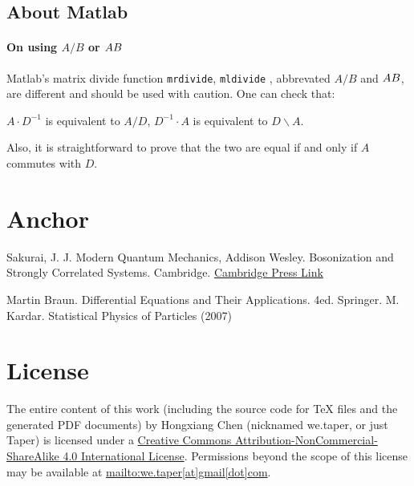 \documentclass{article}
\numberwithin{equation}{subsection} %
\theoremstyle{definition}
\begin{document}
    \subsection{About Matlab}
    \label{sec:About-Matlab}
    \paragraph{On using $A/B$ or $A\\B$}
    Matlab's matrix divide function \texttt{mrdivide}, \texttt{mldivide}
    , abbrevated $A/B$ and $A\\B$, are different and should be used with
    caution. One can check that:
    \begin{center}
        $A\cdot D^{-1}$ is equivalent to $A/D$, $D^{-1}\cdot A$ is
        equivalent to $D\backslash A$.
    \end{center}
    Also, it is straightforward to prove that the two are equal if and only if $A$ commutes with $D$.
\section{Anchor}
\begin{thebibliography}{1}
	 Sakurai, J. J. Modern Quantum Mechanics, Addison Wesley.
        Bosonization and Strongly Correlated Systems. Cambridge.
        \href{http://www.cambridge.org/us/academic/subjects/physics/condensed-matter-physics-nanoscience-and-mesoscopic-physics/bosonization-and-strongly-correlated-systems}{Cambridge Press Link}

     Martin Braun. Differential Equations and Their
    Applications. 4ed. Springer.
     M. Kardar. Statistical Physics of Particles (2007)
\end{thebibliography}
\section{License}
The entire content of this work (including the source code
for TeX files and the generated PDF documents) by 
Hongxiang Chen (nicknamed we.taper, or just Taper) is
licensed under a 
\href{http://creativecommons.org/licenses/by-nc-sa/4.0/}{Creative 
Commons Attribution-NonCommercial-ShareAlike 4.0 International 
License}. Permissions beyond the scope of this 
license may be available at \url{mailto:we.taper[at]gmail[dot]com}.
\end{document}
